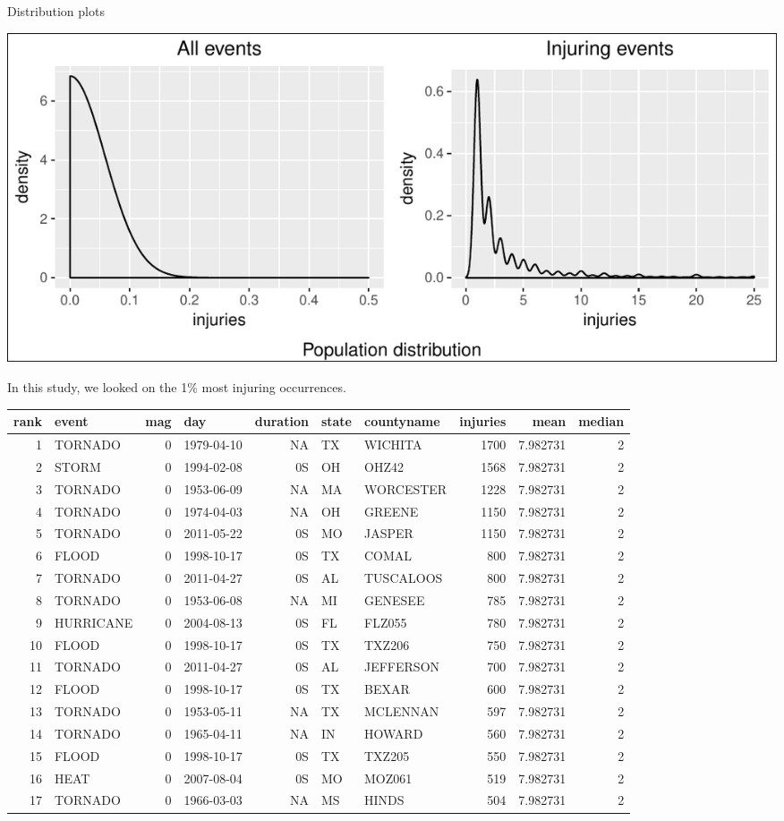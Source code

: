\documentclass[]{article}
\begin{document}
Distribution plots

\includegraphics{readme_files/figure-latex/inj-distribution-1.pdf}

In this study, we looked on the 1\% most injuring occurrences.

\begin{longtable}[]{@{}rlrlrllrrr@{}}
\toprule
rank & event & mag & day & duration & state & countyname & injuries &
mean & median\tabularnewline
\midrule
\endhead
1 & TORNADO & 0 & 1979-04-10 & NA & TX & WICHITA & 1700 & 7.982731 &
2\tabularnewline
2 & STORM & 0 & 1994-02-08 & 0S & OH & OHZ42 & 1568 & 7.982731 &
2\tabularnewline
3 & TORNADO & 0 & 1953-06-09 & NA & MA & WORCESTER & 1228 & 7.982731 &
2\tabularnewline
4 & TORNADO & 0 & 1974-04-03 & NA & OH & GREENE & 1150 & 7.982731 &
2\tabularnewline
5 & TORNADO & 0 & 2011-05-22 & 0S & MO & JASPER & 1150 & 7.982731 &
2\tabularnewline
6 & FLOOD & 0 & 1998-10-17 & 0S & TX & COMAL & 800 & 7.982731 &
2\tabularnewline
7 & TORNADO & 0 & 2011-04-27 & 0S & AL & TUSCALOOS & 800 & 7.982731 &
2\tabularnewline
8 & TORNADO & 0 & 1953-06-08 & NA & MI & GENESEE & 785 & 7.982731 &
2\tabularnewline
9 & HURRICANE & 0 & 2004-08-13 & 0S & FL & FLZ055 & 780 & 7.982731 &
2\tabularnewline
10 & FLOOD & 0 & 1998-10-17 & 0S & TX & TXZ206 & 750 & 7.982731 &
2\tabularnewline
11 & TORNADO & 0 & 2011-04-27 & 0S & AL & JEFFERSON & 700 & 7.982731 &
2\tabularnewline
12 & FLOOD & 0 & 1998-10-17 & 0S & TX & BEXAR & 600 & 7.982731 &
2\tabularnewline
13 & TORNADO & 0 & 1953-05-11 & NA & TX & MCLENNAN & 597 & 7.982731 &
2\tabularnewline
14 & TORNADO & 0 & 1965-04-11 & NA & IN & HOWARD & 560 & 7.982731 &
2\tabularnewline
15 & FLOOD & 0 & 1998-10-17 & 0S & TX & TXZ205 & 550 & 7.982731 &
2\tabularnewline
16 & HEAT & 0 & 2007-08-04 & 0S & MO & MOZ061 & 519 & 7.982731 &
2\tabularnewline
17 & TORNADO & 0 & 1966-03-03 & NA & MS & HINDS & 504 & 7.982731 &
2\tabularnewline
\bottomrule
\end{longtable}
\end{document}
